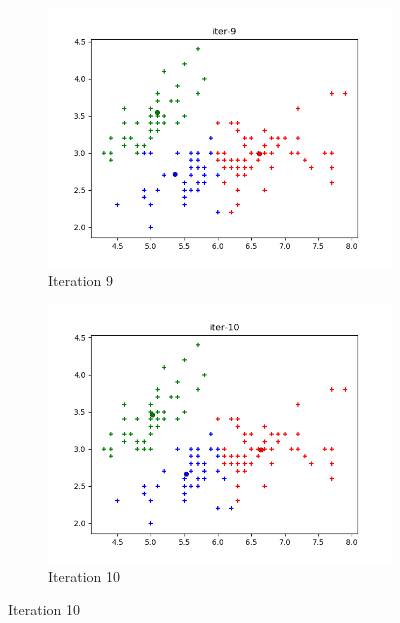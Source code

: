 \documentclass[french]{article}
\begin{document}
\begin{figure}[h!]
\centering
\begin{subfigure}{.5\textwidth}
  \centering
  \includegraphics[width=\linewidth]{img/iter-9.png}
  \caption{Iteration 9}
\end{subfigure}%
\begin{subfigure}{.5\textwidth}
  \centering
  \includegraphics[width=\linewidth]{img/iter-10.png}
  \caption{Iteration 10}
\end{subfigure}%
\end{figure}
\end{document}

